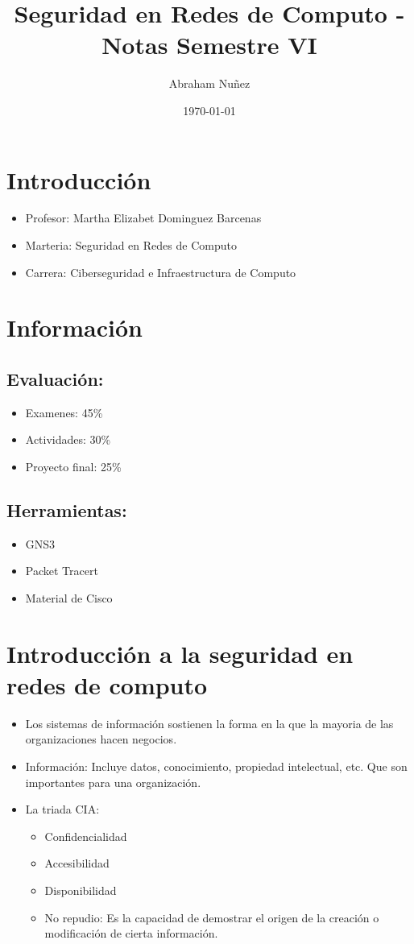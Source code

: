 \documentclass[11pt]{article}
\author{Abraham Nuñez}
\date{\today}
\title{Seguridad en Redes de Computo - Notas Semestre VI}
\begin{document}
\maketitle
\tableofcontents

\section{Introducción}
\label{sec:org86b12c2}
\begin{itemize}
\item Profesor: Martha Elizabet Dominguez Barcenas
\item Marteria: Seguridad en Redes de Computo
\item Carrera: Ciberseguridad e Infraestructura de Computo
\end{itemize}
\section{Información}
\label{sec:org01ca361}
\subsection{Evaluación:}
\label{sec:org5c10c37}
\begin{itemize}
\item Examenes: 45\%
\item Actividades: 30\%
\item Proyecto final: 25\%
\end{itemize}
\subsection{Herramientas:}
\label{sec:org955c03b}
\begin{itemize}
\item GNS3
\item Packet Tracert
\item Material de Cisco
\end{itemize}
\section{Introducción a la seguridad en redes de computo}
\label{sec:orgafdf53d}
\begin{itemize}
\item Los sistemas de información sostienen la forma en la que la mayoria de las organizaciones hacen negocios.
\item Información: Incluye datos, conocimiento, propiedad intelectual, etc. Que son importantes para una organización.
\item La triada CIA:
\begin{itemize}
\item Confidencialidad
\item Accesibilidad
\item Disponibilidad
\item No repudio: Es la capacidad de demostrar el origen de la creación o modificación de cierta información.
\end{itemize}
\end{itemize}
\end{document}

